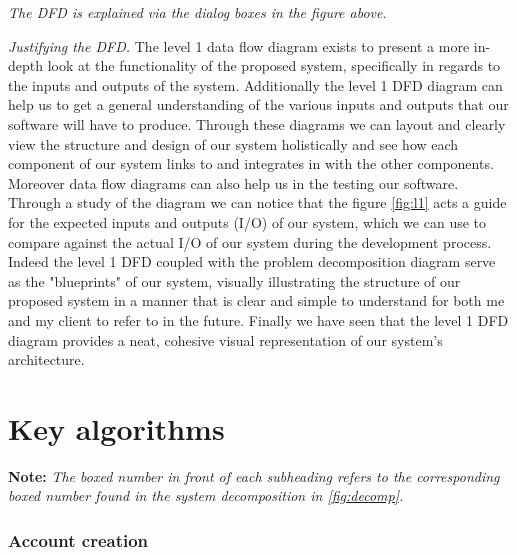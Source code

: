 \textit{The DFD is explained via the dialog boxes in
the figure above}.\\ \vspace{0.2cm}

\textit{Justifying the DFD.} The level 1 data flow diagram
exists to present a more in-depth look at the functionality of
the proposed system, specifically in regards to the inputs and
outputs of the system. Additionally the level 1 DFD diagram can help
us to get a general understanding of the various inputs and
outputs that our software will have to produce. Through these
diagrams we can layout and clearly view the structure and
design of our system holistically and see how each component
of our system links to and integrates in with the other components.
Moreover data flow diagrams can also help us in the testing our
software. Through a study of the diagram we can notice that the
figure \ref{fig:l1} acts a guide for the expected inputs and
outputs (I/O) of our system, which we can use to compare against
the actual I/O of our system during the development process.
Indeed the level 1 DFD coupled with the problem decomposition
diagram serve as the "blueprints" of our system, visually
illustrating the structure of our proposed system in a manner
that is clear and simple to understand for both me and my client
to refer to in the future.
Finally we have seen that the level 1 DFD diagram provides a
neat, cohesive visual representation of our system's architecture.

\section{Key algorithms}
\label{sec:algos}



\textbf{Note:} \textit{The boxed number in front of each subheading refers
to the corresponding boxed number found in the system
decomposition in \ref{fig:decomp}.}

\subsubsection{ Account creation}


